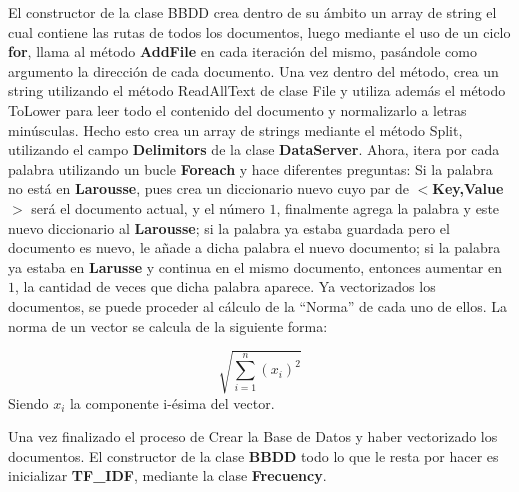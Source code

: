 \documentclass[10pt,a4paper]{article}
\begin{document}
\setlength{\parindent}{1em} El constructor de la clase BBDD crea dentro de su \'ambito un array de string el cual contiene las rutas de todos los documentos, luego mediante el uso de un ciclo \textbf{for}, llama al m\'etodo \textbf{AddFile} en cada iteraci\'on del mismo, pas\'andole como argumento la direcci\'on de cada documento. Una vez dentro del m\'etodo, crea un string utilizando el m\'etodo ReadAllText de clase File y utiliza adem\'as el m\'etodo ToLower para leer todo el contenido del documento y normalizarlo a letras min\'usculas. Hecho esto crea un array de strings mediante el m\'etodo Split, utilizando el campo \textbf{Delimitors} de la clase \textbf{DataServer}. Ahora, itera por cada palabra utilizando un bucle \textbf{Foreach} y hace diferentes preguntas: Si la palabra no est\'a en \textbf{Larousse}, pues crea un diccionario nuevo cuyo par de \textbf{$<$Key,Value$>$} ser\'a el documento actual, y el n\'umero $1$, finalmente agrega la palabra y este nuevo diccionario al \textbf{Larousse}; si la palabra ya estaba guardada pero el documento es nuevo, le a\~nade a dicha palabra el nuevo documento; si la palabra ya estaba en \textbf{Larusse} y continua en el mismo documento, entonces aumentar en $1$, la cantidad de veces que dicha palabra aparece.
\setlength{\parindent}{1em} Ya vectorizados los documentos, se puede proceder al c\'alculo de la ``Norma'' de cada uno de ellos. La norma de un vector se calcula de la siguiente forma:

{\LARGE \begin{equation*}
\sqrt{\sum\limits_{i = 1}^{n} (x_i)^2}
\end{equation*}}
Siendo $x_i$ la componente i-\'esima del vector.

\setlength{\parindent}{1em} Una vez finalizado el proceso de Crear la Base de Datos y haber vectorizado los documentos. El constructor de la clase \textbf{BBDD} todo lo que le resta por hacer es inicializar \textbf{TF\_IDF}, mediante la clase \textbf{Frecuency}.
\end{document}

